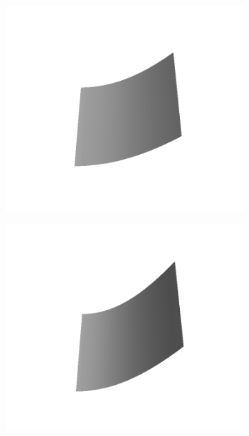 \documentclass[../document.tex]{subfiles}
\begin{document}
\begin{figure}[htbp]
\begin{subfigure}[b]{0.24\textwidth}
    \includegraphics[width=\linewidth]{../img/5/custom_patches/ramp/all/09-3d.png}
    \end{subfigure}
    \begin{subfigure}[b]{0.24\textwidth}
    \includegraphics[width=\linewidth]{../img/5/custom_patches/ramp/all/11-3d.png}
    \end{subfigure}
    \begin{subfigure}[b]{0.24\textwidth}

\end{subfigure}
\end{figure}
\end{document}
